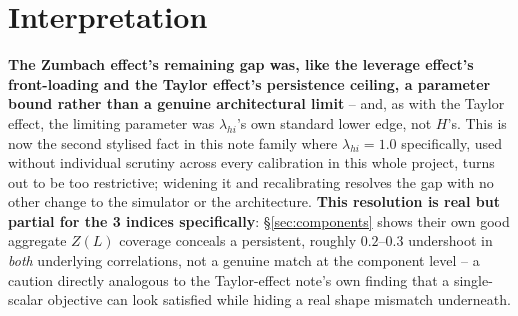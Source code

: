 \documentclass[11pt]{article}
\begin{document}
\section{Interpretation}
\textbf{The Zumbach effect's remaining gap was, like the leverage effect's
front-loading and the Taylor effect's persistence ceiling, a parameter bound
rather than a genuine architectural limit} -- and, as with the Taylor effect,
the limiting parameter was $\lambda_{hi}$'s own standard lower edge, not
$H$'s. This is now the second stylised fact in this note family where
$\lambda_{hi}=1.0$ specifically, used without individual scrutiny across
every calibration in this whole project, turns out to be too restrictive;
widening it and recalibrating resolves the gap with no other change to the
simulator or the architecture. \textbf{This resolution is real but partial
for the 3 indices specifically}: \S\ref{sec:components} shows their own good
aggregate $Z(L)$ coverage conceals a persistent, roughly $0.2$--$0.3$
undershoot in \emph{both} underlying correlations, not a genuine match at
the component level -- a caution directly analogous to the Taylor-effect
note's own finding that a single-scalar objective can look satisfied while
hiding a real shape mismatch underneath.
\end{document}
